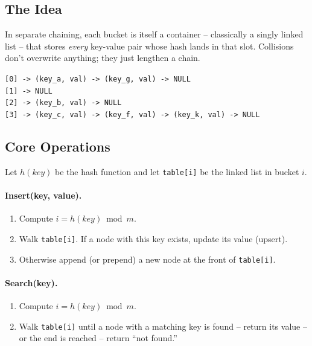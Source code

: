 \documentclass[11pt]{article}
\begin{document}
\subsection*{The Idea}
In separate chaining, each bucket is itself a container -- classically a
singly linked list -- that stores \emph{every} key-value pair whose hash
lands in that slot. Collisions don't overwrite anything; they just
lengthen a chain.

\begin{center}
\texttt{[0] -> (key\_a, val) -> (key\_g, val) -> NULL}\\
\texttt{[1] -> NULL}\\
\texttt{[2] -> (key\_b, val) -> NULL}\\
\texttt{[3] -> (key\_c, val) -> (key\_f, val) -> (key\_k, val) -> NULL}
\end{center}

\subsection*{Core Operations}
Let $h(key)$ be the hash function and let \texttt{table[i]} be the
linked list in bucket $i$.

\paragraph{Insert(key, value).}
\begin{enumerate}[leftmargin=*]
    \item Compute $i = h(key) \bmod m$.
    \item Walk \texttt{table[i]}. If a node with this key exists, update
          its value (upsert).
    \item Otherwise append (or prepend) a new node at the front of
          \texttt{table[i]}.
\end{enumerate}

\paragraph{Search(key).}
\begin{enumerate}[leftmargin=*]
    \item Compute $i = h(key) \bmod m$.
    \item Walk \texttt{table[i]} until a node with a matching key is
          found -- return its value -- or the end is reached -- return
          ``not found.''
\end{enumerate}
\end{document}

